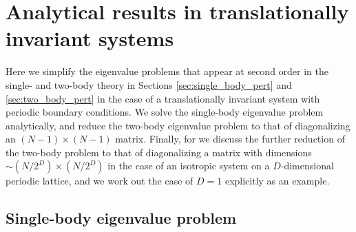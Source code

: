 \documentclass[nofootinbib,notitlepage,11pt]{revtex4-2}
\newcommand{\p}[1]{\left(#1\right)} %
\newcommand{\1}{\mathds{1}}
\begin{document}
\section{Analytical results in translationally invariant systems}
\label{sec:trans_inv}

Here we simplify the eigenvalue problems that appear at second order
in the single- and two-body theory in Sections
\ref{sec:single_body_pert} and \ref{sec:two_body_pert} in the case of
a translationally invariant system with periodic boundary conditions.
We solve the single-body eigenvalue problem analytically, and reduce
the two-body eigenvalue problem to that of diagonalizing an
$\p{N-1}\times\p{N-1}$ matrix.  Finally, for we discuss the further
reduction of the two-body problem to that of diagonalizing a matrix
with dimensions $\sim\p{N/2^D}\times\p{N/2^D}$ in the case of an
isotropic system on a $D$-dimensional periodic lattice, and we work
out the case of $D=1$ explicitly as an example.

\subsection{Single-body eigenvalue problem}
\label{sec:trans_inv_single}
\end{document}
